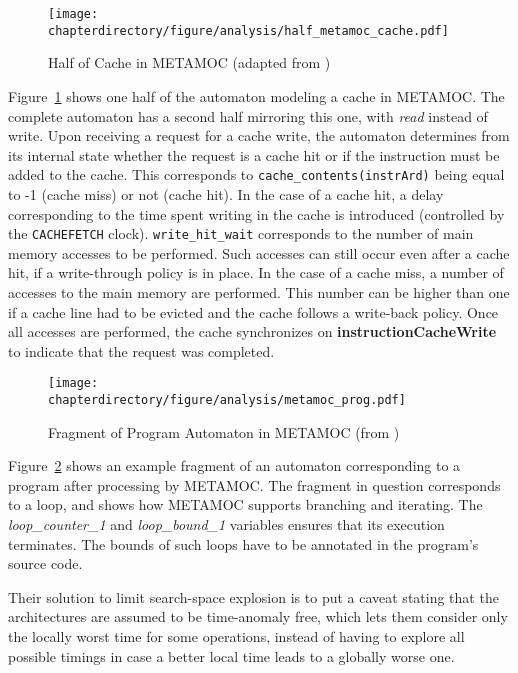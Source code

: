 \begin{figure}[hbt!]
\begin{center}
\texttt{[image: \\chapterdirectory/figure/analysis/half\_metamoc\_cache.pdf]}
\end{center}
\caption{Half of Cache in METAMOC (adapted from \cite{dalsgaard_olesen_toft_2020})}%
\label{fig:formal_analysis:metamoc_caches}
\end{figure}

Figure~\ref{fig:formal_analysis:metamoc_caches} shows one half of the automaton
modeling a cache in METAMOC. The complete automaton has a second half mirroring
this one, with \textit{read} instead of write. Upon receiving a request for
a cache write, the automaton determines from its internal state whether the
request is a cache hit or if the instruction must be added to the cache. This
corresponds to \lstinline{cache_contents(instrArd)} being equal to -1 (cache
miss) or not (cache hit). In the case of a cache hit, a delay corresponding to
the time spent writing in the cache is introduced (controlled by
the \lstinline{CACHEFETCH} clock). \lstinline{write_hit_wait} corresponds to
the number of main memory accesses to be performed. Such accesses can still
occur even after a cache hit, if a write-through policy is in place. In the
case of a cache miss, a number of accesses to the main memory are performed.
This number can be higher than one if a cache line had to be evicted and the
cache follows a write-back policy. Once all accesses are performed, the cache
synchronizes on \textbf{instructionCacheWrite} to indicate that the request
was completed.

\begin{figure}[hbt!]
\begin{center}
\texttt{[image: \\chapterdirectory/figure/analysis/metamoc\_prog.pdf]}
\end{center}
\caption{Fragment of Program Automaton in METAMOC (from \cite{dalsgaard_olesen_toft_2020})
}
\label{fig:formal_analysis:metamoc_program}
\end{figure}

Figure~\ref{fig:formal_analysis:metamoc_program} shows an example fragment of
an automaton corresponding to a program after processing by METAMOC. The
fragment in question corresponds to a loop, and shows how METAMOC supports
branching and iterating. The \textit{loop\_counter\_1} and
\textit{loop\_bound\_1} variables ensures that its execution terminates. The
bounds of such loops have to be annotated in the program's source code.

Their solution to limit search-space explosion is to put a caveat stating that
the architectures are assumed to be time-anomaly free, which lets them consider
only the locally worst time for some operations, instead of having to explore
all possible timings in case a better local time leads to a globally worse one.

\stopallthesefloats
